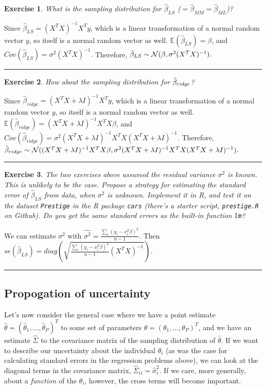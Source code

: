 \documentclass[twoside]{article}
\newcounter{lecnum}
\newtheorem{exercise}{Exercise}[lecnum]
\newenvironment{proof}{{\bf Proof:}}{\hfill\rule{2mm}{2mm}}
\newcommand\E{\mathbb{E}}
\begin{document}
\begin{exercise}
  What is the sampling distribution for $\hat{\beta}_{LS}$ ($=\hat{\beta}_{MM}=\hat{\beta}_{ML}$)?
\end{exercise}
\begin{proof}
Since $\hat{\beta}_{LS} = (X^TX)^{-1}X^Ty$, which is a linear transformation of a normal random vector $y$, so itself is a normal random vector as well.
$\E(\hat{\beta}_{LS}) = \beta$, and $Cov(\hat{\beta}_{LS}) = \sigma^2(X^TX)^{-1}.$
Therefore, $\hat{\beta}_{LS}\sim {\cal N}( \beta,\sigma^2(X^TX)^{-1}).$
\end{proof}
\begin{exercise}
  How about the sampling distribution for $\hat{\beta}_{\small{ridge}}$?
\end{exercise}
\begin{proof}
Since $\hat{\beta}_{ridge} = (X^TX+\lambda I)^{-1}X^Ty$, which is a linear transformation of a normal random vector $y$, so itself is a normal random vector as well.
$\E(\hat{\beta}_{ridge}) = (X^TX+\lambda I)^{-1}X^TX\beta$, and $Cov(\hat{\beta}_{ridge}) = \sigma^2(X^TX+\lambda I)^{-1}X^TX(X^TX+\lambda I)^{-1}.$
Therefore, $\hat{\beta}_{ridge}\sim {\cal N}( (X^TX+\lambda I)^{-1}X^TX\beta,\sigma^2(X^TX+\lambda I)^{-1}X^TX(X^TX+\lambda I)^{-1}).$
\end{proof}

\begin{exercise}
  The two exercises above assumed the residual variance $\sigma^2$ is known. This is unlikely to be the case. Propose a strategy for estimating the standard error of $\hat{\beta}_{LS}$ from data, when $\sigma^2$ is unknown. Implement it in R, and test it on the dataset \texttt{Prestige} in the R package \texttt{cars} (there's a starter script, \texttt{prestige.R} on Github). Do you get the same standard errors as the built-in function \texttt{lm}?
\end{exercise}

\begin{proof}
We can estimate $\sigma^2$ with $\hat{\sigma^2} = \frac{\sum_i(y_i-x_i^T\beta)^2}{n-1}$. Then $se(\hat{\beta}_{LS}) = diag(\sqrt{\frac{\sum_i(y_i-x_i^T\beta)^2}{n-1}(X^TX)^{-1}}).$
\end{proof}

\subsection{Propogation of uncertainty}
Let's now consider the general case where we have a point estimate $\hat{\theta} = (\hat{\theta}_1,\dots, \hat{\theta}_P)^T$ to some set of parameters $\theta = (\theta_1,\dots,\theta_P)^T$, and we have an estimate $\hat{\Sigma}$ to the covariance matrix of the sampling distribution of $\hat{\theta}$. If we want to describe our uncertainty about the individual $\theta_i$ (as was the case for calculating standard errors in the regression problems above), we can look at the diagonal terms in the covariance matrix, $\hat{\Sigma}_{ii} = \hat{\sigma}_i^2$. If we care, more generally, about a \textit{function} of the $\theta_i$, however, the cross terms will become important.
\end{document}
